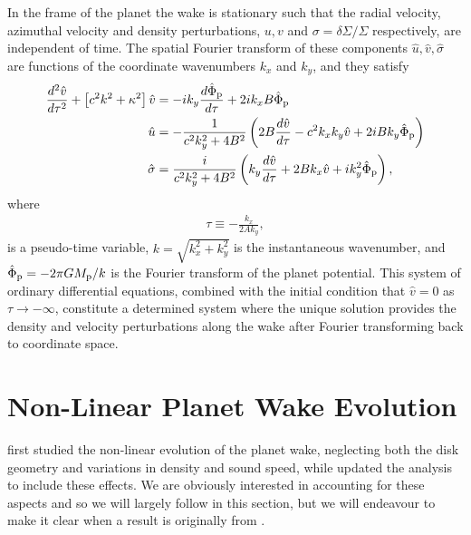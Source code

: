 In the frame of the planet the wake is stationary such that the radial velocity, azimuthal velocity and density perturbations, $u, v$ and $\sigma = \delta \Sigma / \Sigma$ respectively, are independent of time.
The spatial Fourier transform of these components $\hat{u}, \hat{v}, \hat{\sigma}$ are functions of the coordinate wavenumbers $k_x$ and $k_y$, and they satisfy \citep{goldreich1978,goldreich1980}
\begin{align}
    \frac{d^2 \hat{v}}{d \tau^2} + \left[ c^2 k^2 + \kappa^2 \right]\hat{v} &= -i k_y \frac{d \hat{\Phi}_{\rm p}}{d\tau} + 2i k_x B \hat{\Phi}_{\rm p} \\
    \hat{u} &= - \frac{1}{c^2 k_y^2 + 4 B^2} \left( 2 B \frac{d \hat{v}}{d\tau} - c^2 k_x k_y \hat{v} + 2iBk_y \hat{\Phi}_{\rm p} \right) \\
    \hat{\sigma} &= \frac{i}{c^2 k_y^2 + 4 B^2} \left( k_y \frac{d \hat{v}}{d \tau} + 2B k_x \hat{v} + i k_y^2 \hat{\Phi}_{\rm p} \right),
\end{align}
where
\begin{align}
    \tau \equiv -\frac{k_x}{2 A k_y},
\end{align}
is a pseudo-time variable, $k=\sqrt{k_x^2 + k_y^2}$ is the instantaneous wavenumber, and $\hat{\Phi}_{\rm p}=-2\pi G M_{\rm p} / k$ is the Fourier transform of the planet potential.
This system of ordinary differential equations, combined with the initial condition that $\hat{v}=0$ as $\tau \rightarrow - \infty$, constitute a determined system where the unique solution provides the density and velocity perturbations along the wake after Fourier transforming back to coordinate space.

\section{Non-Linear Planet Wake Evolution} \label{sec:nonlinear_evolution}

\citet{goodman2001} first studied the non-linear evolution of the planet wake, neglecting both the disk geometry and variations in density and sound speed, while \citet{rafikov2002a} updated the analysis to include these effects.
We are obviously interested in accounting for these aspects and so we will largely follow \citet{rafikov2002a} in this section, but we will endeavour to make it clear when a result is originally from \citet{goodman2001}.

